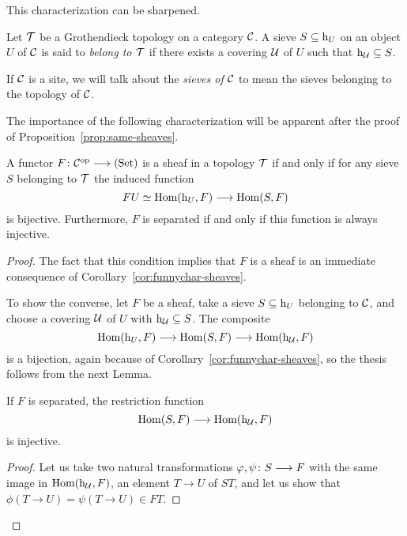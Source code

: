 \begin{2   CONTRAVARIANT FUNCTORS}
\begin{2.3 Sheaves in Grothendieck topologies}
This characterization can be sharpened.

\begin{definition}
Let $\mathcal{T}$ be a Grothendieck topology on a category $\mathcal{C}$. A sieve $S \subseteq \mathrm{h}_{U}$ on an object $U$ of $\mathcal{C}$ is said to \emph{belong to $\mathcal{T}$}%
 if there exists a covering $\mathcal{U}$ of $U$ such that $\mathrm{h}_{\mathcal{U}} \subseteq S$.
\end{definition}

If $\mathcal{C}$ is a site, we will talk about the \emph{sieves of $\mathcal{C}$} to mean the sieves belonging to the topology of $\mathcal{C}$.

The importance of the following characterization will be apparent after the proof of Proposition~\ref{prop:same-sheaves}.

\begin{proposition}\label{prop:funnychar-sheaves}%
%
%
A functor $F \colon \cC\op \arr \catset$ is a sheaf in a topology $\mathcal{T}$ if and only if for any sieve $S$ belonging to $\mathcal{T}$ the induced function
   \[
   FU \simeq \hom(\h_U, F) \arr  \hom(S, F)
   \]
is bijective. Furthermore, $F$ is separated if and only if this function is always injective.
\end{proposition}

\begin{proof}
The fact that this condition implies that $F$ is a sheaf is an immediate consequence of Corollary~\ref{cor:funnychar-sheaves}.

To show the converse, let $F$ be a sheaf, take a sieve $S \subseteq \mathrm{h}_{U}$ belonging to $\mathcal{C}$, and choose a covering $\mathcal{U}$ of $U$ with $\mathrm{h}_{\mathcal{U}} \subseteq S$. The composite
   \[
   \hom(\h_{U}, F) \arr \hom(S, F) \arr \hom(\h_{\cU}, F)
   \]
is a bijection, again because of Corollary~\ref{cor:funnychar-sheaves}, so the thesis follows from the next Lemma.

\begin{lemma}\label{lem:separated->injective}
If $F$ is separated, the restriction function
   \[
   \hom(S, F) \arr \hom(\h_{\cU}, F)
   \]
is injective.
\end{lemma}

\begin{proof}
Let us take two natural transformations $\phi, \psi \colon S \arr F$ with the same image in $\operatorname{Hom}(\mathrm{h}_{\mathcal{U}}, F)$, an element $T \to U$ of $ST$, and let us show that $\phi(T \to U) = \psi(T \to U) \in FT$.


\end{proof}
\end{proof}
\end{2.3 Sheaves in Grothendieck topologies}
\end{2   CONTRAVARIANT FUNCTORS}
